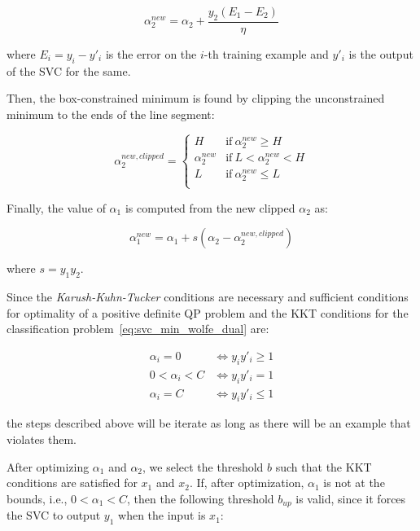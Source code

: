 \begin{equation} \label{eq:smo_svc_a2_new}
	\alpha_2^{new} = \alpha_2 + \frac{y_2(E_1 - E_2)}{\eta}
\end{equation}

where $E_i = y_i - y'_i$ is the error on the $i$-th training example and $y'_i$ is the output of the SVC for the same.

Then, the box-constrained minimum is found by clipping the unconstrained minimum to the ends of the line segment:

\begin{equation} \label{eq:smo_svc_a2_new_clipped}
    \alpha_2^{new,clipped} =
        \begin{cases}
            H & \text{if} \ \alpha_2^{new} \geq H \\
            \alpha_2^{new} & \text{if} \ L < \alpha_2^{new} < H \\
            L & \text{if} \ \alpha_2^{new} \leq L \\
        \end{cases}
\end{equation}

Finally, the value of $\alpha_1$ is computed from the new clipped $\alpha_2$ as:

\begin{equation} \label{eq:smo_svc_a1_new}
	\alpha_1^{new} = \alpha_1 + s (\alpha_2 - \alpha_2^{new,clipped})
\end{equation}

where $s = y_1 y_2$.

Since the \emph{Karush-Kuhn-Tucker} conditions are necessary and sufficient conditions for optimality of a positive definite QP problem and the KKT conditions for the classification problem~\eqref{eq:svc_min_wolfe_dual} are:

\begin{equation} \label{eq:svc_smo_kkt}
	\begin{aligned}
		\alpha_i = 0 & \Leftrightarrow y_i y'_i \geq 1 \\
		0 < \alpha_i < C & \Leftrightarrow y_i y'_i = 1 \\
		\alpha_i = C & \Leftrightarrow y_i y'_i \leq 1
	\end{aligned}
\end{equation}

the steps described above will be iterate as long as there will be an example that violates them.

After optimizing $\alpha_1$ and $\alpha_2$, we select the threshold $b$ such that the KKT conditions are satisfied for $x_1$ and $x_2$. If, after optimization, $\alpha_1$ is not at the bounds, i.e., $0 < \alpha_1 < C$, then the following threshold $b_{up}$ is valid, since it forces the SVC to output $y_1$ when the input is $x_1$:

